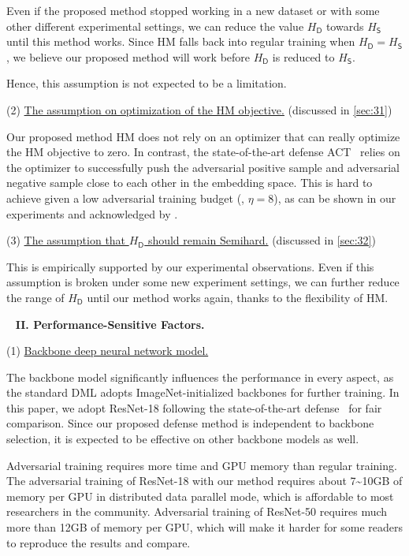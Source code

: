Even if the proposed method stopped working in a new dataset or with some other
different experimental settings, we can reduce
the value $H_\mathsf{D}$ towards $H_\mathsf{S}$ until this method works.
%
Since HM falls back into regular training when $H_\mathsf{D}=H_\mathsf{S}$,
we believe our proposed method will work before $H_\mathsf{D}$ is reduced
to $H_\mathsf{S}$.

Hence, this assumption is not expected to be a limitation.

(2) \ul{The assumption on optimization of the HM objective.}
(discussed in \cref{sec:31})

Our proposed method HM does not rely on an optimizer that can really optimize
the HM objective to zero.
%
In contrast, the state-of-the-art defense ACT~\cite{robrank} relies on the
optimizer to successfully push the adversarial positive sample and adversarial
negative sample close to each other in the embedding space.
%
This is hard to achieve given a low adversarial training budget (\eg, $\eta=8$),
as can be shown in our experiments and acknowledged by \cite{robrank}.

(3) \ul{The assumption that $H_\mathsf{D}$ should remain Semihard.}
(discussed in \cref{sec:32})

This is empirically supported by our experimental observations.
%
Even if this assumption is broken under some new experiment settings,
we can further reduce the range of $H_\mathsf{D}$ until our method works again,
thanks to the flexibility of HM.

~\newline
\noindent\textbf{II. Performance-Sensitive Factors.}

(1) \ul{Backbone deep neural network model.}

The backbone model significantly influences the performance in every aspect, as
the standard DML adopts ImageNet-initialized backbones for further training.
%
In this paper, we adopt ResNet-18 following the state-of-the-art
defense~\cite{robrank} for fair comparison.
%
Since our proposed defense method is independent to backbone selection, it is
expected to be effective on other backbone models as well.

Adversarial training requires more time and GPU memory than regular training.
%
The adversarial training of ResNet-18 with our method requires about 7\~{}10GB
of memory per GPU in distributed data parallel mode, which is affordable to
most researchers in the community.
%
Adversarial training of ResNet-50 requires much more than 12GB of memory per
GPU, which will make it harder for some readers to reproduce the results
and compare.


